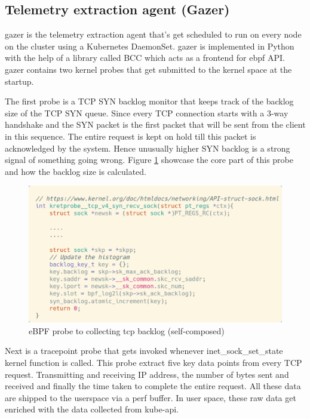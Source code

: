 \subsection{Telemetry extraction agent (Gazer)}

\ac{gazer} is the telemetry extraction agent that's get scheduled to run on every node on the cluster using a Kubernetes DaemonSet. \ac{gazer} is implemented in Python with the help of a library called BCC which acts as a frontend for \ac{ebpf} API. \ac{gazer} contains two kernel probes that get submitted to the kernel space at the startup. 

The first probe is a TCP SYN backlog monitor that keeps track of the backlog size of the TCP SYN queue. Since every TCP connection starts with a 3-way handshake and the SYN packet is the first packet that will be sent from the client in this sequence. The entire request is kept on hold till this packet is acknowledged by the system. Hence unusually higher SYN backlog is a strong signal of something going wrong. Figure \ref{fig:backlog-probe} showcase the core part of this probe and how the backlog size is calculated.

\begin{figure}[H]
    \includegraphics[width=13cm]{assets/implementation/backlog-probe.png}
    \caption{eBPF probe to collecting tcp backlog (self-composed)}
    \label{fig:backlog-probe}
\end{figure}

Next is a tracepoint probe that gets invoked whenever inet\_sock\_set\_state kernel function is called. This probe extract five key data points from every TCP request. Transmitting and receiving IP address, the number of bytes sent and received and finally the time taken to complete the entire request. All these data are shipped to the userspace via a perf buffer. In user space, these raw data get enriched with the data collected from kube-api. 

